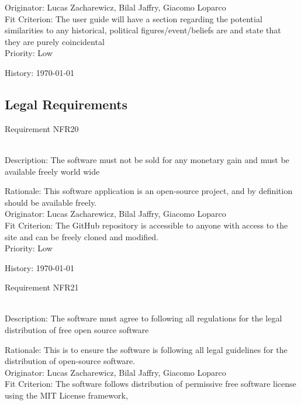 \documentclass[12pt, titlepage]{article}
\begin{document}
\begin{enumerate}
{\color{blue}Originator:  Lucas Zacharewicz, Bilal Jaffry, Giacomo Loparco}\\

{\color{blue}Fit Criterion: The user guide will have a section regarding the potential similarities to any historical, political figures/event/beliefs are and state that they are purely coincidental}\\
 
{\color{blue}Priority: Low}
  
{\color{blue}History: \today}

\subsection{Legal Requirements}
{\color{blue}\item Requirement NFR20}\\
{\color{blue}Description:} The software must not be sold for any monetary gain and must be available freely world wide

{\color{blue}Rationale: This software application is an open-source project, and by definition should be available freely.}\\

{\color{blue}Originator:  Lucas Zacharewicz, Bilal Jaffry, Giacomo Loparco}\\

{\color{blue}Fit Criterion: The GitHub repository is accessible to anyone with access to the site and can be freely cloned and modified.}\\
 
{\color{blue}Priority: Low}
  
{\color{blue}History: \today}

{\color{blue}\item Requirement NFR21}\\
{\color{blue}Description:} The software must agree to following all regulations for the legal distribution of free open source software

{\color{blue}Rationale: This is to ensure the software is following all legal guidelines for the distribution of open-source software.}\\

{\color{blue}Originator:  Lucas Zacharewicz, Bilal Jaffry, Giacomo Loparco}\\

{\color{blue}Fit Criterion: The software follows distribution of permissive free software license using the MIT License framework,}\\
 

\end{enumerate}
\end{document}
